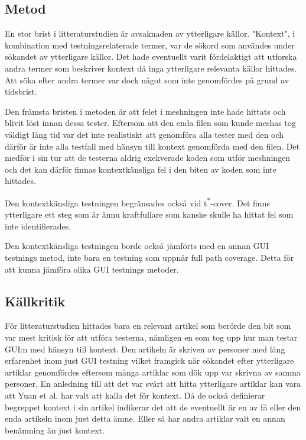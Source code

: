 \subsection{Metod}

En stor brist i litteraturstudien är avsaknaden av ytterligare källor. "Kontext", i kombination med testningsrelaterade termer, var de sökord som användes under sökandet av ytterligare källor. Det hade eventuellt varit fördelaktigt att utforska andra termer som beskriver kontext då inga ytterligare relevanta källor hittades. Att söka efter andra termer var dock något som inte genomfördes på grund av tidsbrist.

Den främsta bristen i metoden är att felet i meshningen inte hade hittats och blivit löst innan dessa tester. Eftersom att den enda filen som kunde meshas tog väldigt lång tid var det inte realistiskt att genomföra alla tester med den och därför är inte alla testfall med hänsyn till kontext genomförda med den filen. Det medför i sin tur att de testerna aldrig exekverade koden som utför meshningen och det kan därför finnas kontextkänsliga fel i den biten av koden som inte hittades.

Den kontextkänsliga testningen begränsades också vid t\textsuperscript{*}-cover. Det finns ytterligare ett steg som är ännu kraftfullare som kanske skulle ha hittat fel som inte identifierades.

Den kontextkänsliga testningen borde också jämförts med en annan GUI testnings metod, inte bara en testning som uppnår full path coverage. Detta för att kunna jämföra olika GUI testnings metoder.

\subsection{Källkritik}

För litteraturstudien hittades bara en relevant artikel som berörde den bit som var mest kritisk för att utföra testerna, nämligen en som tog upp hur man testar GUI:n med hänsyn till kontext. Den artikeln är skriven av personer med lång erfarenhet inom just GUI testning vilket framgick när sökandet efter ytterligare artiklar genomfördes eftersom många artiklar som dök upp var skrivna av samma personer. En anledning  till att det var svårt att hitta ytterligare artiklar kan vara att Yuan et al. \cite{yuan2011gui} har valt att kalla det för kontext. Då de också definierar begreppet kontext i sin artikel indikerar det att de eventuellt är en av få eller den enda artikeln inom just detta ämne. Eller så har andra artiklar valt en annan benämning än just kontext.

